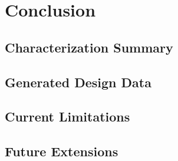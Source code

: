 
\section{Conclusion}
\label{sec:conclusion}

\subsection{Characterization Summary}



\subsection{Generated Design Data}



\subsection{Current Limitations}



\subsection{Future Extensions}

